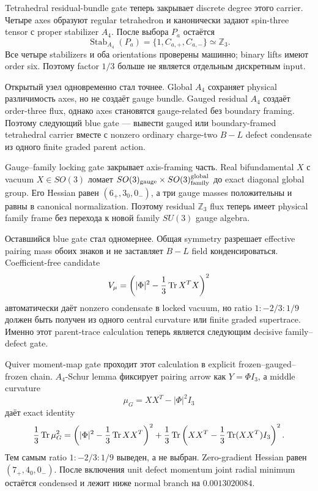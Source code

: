 Tetrahedral residual-bundle gate теперь закрывает discrete degree этого
carrier. Четыре axes образуют regular tetrahedron и канонически задают
spin-three tensor с proper stabilizer \(A_4\). После выбора \(P_a\)
остаётся
\begin{equation}
 \operatorname{Stab}_{A_4}(P_a)
 =\{1,C_{a,+},C_{a,-}\}
 \simeq\mathbb Z_3.
\end{equation}
Все четыре stabilizers и оба orientations проверены машинно; binary lifts
имеют order six. Поэтому factor \(1/3\) больше не является отдельным
дискретным input.

Открытый узел одновременно стал точнее. Global \(A_4\) сохраняет physical
различимость axes, но не создаёт gauge bundle. Gauged residual \(A_4\)
создаёт order-three flux, однако axes становятся gauge-related без
boundary framing. Поэтому следующий blue gate --- вывести gauged или
boundary-framed tetrahedral carrier вместе с nonzero ordinary charge-two
\(B-L\) defect condensate из одного finite graded parent action.

Gauge--family locking gate закрывает axis-framing часть. Real
bifundamental \(X\) с vacuum \(X\in SO(3)\) ломает
\(SO(3)_{\rm gauge}\times SO(3)_{\rm family}^{\rm global}\) до exact
diagonal global group. Его Hessian равен \((6_+,3_0,0_-)\), а три gauge
masses положительны и равны в canonical normalization. Поэтому residual
\(\mathbb Z_3\) flux теперь имеет physical family frame без перехода к
новой family \(SU(3)\) gauge algebra.

Оставшийся blue gate стал одномернее. Общая symmetry разрешает effective
pairing mass обоих знаков и не заставляет \(B-L\) field конденсироваться.
Coefficient-free candidate
\begin{equation}
 V_\mu=\left(|\Phi|^2-\frac13\operatorname{Tr} X^TX\right)^2
\end{equation}
автоматически даёт nonzero condensate в locked vacuum, но ratio
\(1:-2/3:1/9\) должен быть получен из одного central curvature или finite
graded supertrace. Именно этот parent-trace calculation теперь является
следующим decisive family--defect gate.

Quiver moment-map gate проходит этот calculation в explicit
frozen--gauged--frozen chain. \(A_4\)-Schur lemma фиксирует pairing arrow
как \(Y=\Phi I_3\), а middle curvature
\begin{equation}
 \mu_G=XX^T-|\Phi|^2I_3
\end{equation}
даёт exact identity
\begin{equation}
 \frac13\operatorname{Tr}\mu_G^2
 =\left(|\Phi|^2-\frac13\operatorname{Tr} XX^T\right)^2
 +\frac13\operatorname{Tr}\left(XX^T-\frac13\operatorname{Tr}(XX^T)I_3\right)^2.
\end{equation}
Тем самым ratio \(1:-2/3:1/9\) выведен, а не выбран. Zero-gradient
Hessian равен \((7_+,4_0,0_-)\). После включения unit defect momentum
joint radial minimum остаётся condensed и лежит ниже normal branch на
\(0.0013020084\).

